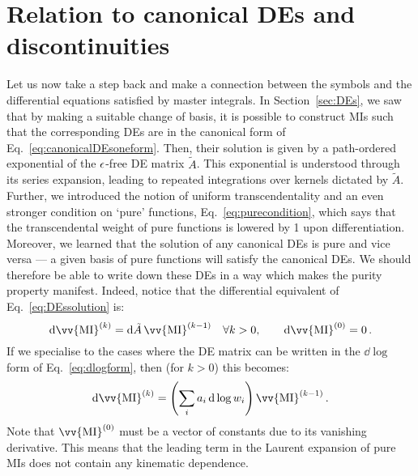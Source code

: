 \documentclass[main.tex]{subfiles}
\begin{document}
\section{Relation to canonical DEs and discontinuities}
Let us now take a step back and make a connection between the symbols and the differential equations satisfied by master integrals. In Section~\ref{sec:DEs}, we saw that by making a suitable change of basis, it is possible to construct MIs such that the corresponding DEs are in the canonical form of Eq.~\ref{eq:canonicalDEsoneform}. Then, their solution is given by a path-ordered exponential of the $\epsilon$-free DE matrix $\tilde{A}$. This exponential is understood through its series expansion, leading to repeated integrations over kernels dictated by $\tilde{A}$. Further, we introduced the notion of uniform transcendentality and an even stronger condition on `pure' functions, Eq.~\ref{eq:purecondition}, which says that the transcendental weight of pure functions is lowered by 1 upon differentiation. Moreover, we learned that the solution of any canonical DEs is pure and vice versa --- a given basis of pure functions will satisfy the canonical DEs. We should therefore be able to write down these DEs in a way which makes the purity property manifest. Indeed, notice that the differential equivalent of Eq.~\ref{eq:DEssolution} is:
\begin{equation}
    \dd \vv{\text{MI}}^{(k)} = \dd \tilde{A} \, \vv{\text{MI}}^{(k-1)} \quad \forall k>0, \qquad \dd \vv{\text{MI}}^{(0)} = 0\,.
\end{equation}
If we specialise to the cases where the DE matrix can be written in the $\dd \log$ form of Eq.~\ref{eq:dlogform}, then (for $k>0$) this becomes:
\begin{equation} \label{eq:pureMIDEs}
    \dd \vv{\text{MI}}^{(k)} = \left( \sum_i a_i \, \dd \log w_i  \right)\vv{\text{MI}}^{(k-1)}\,.
\end{equation}
Note that $\vv{\text{MI}}^{(0)}$ must be a vector of constants due to its vanishing derivative. This means that the leading term in the Laurent expansion of pure MIs does not contain any kinematic dependence. 
\end{document}

